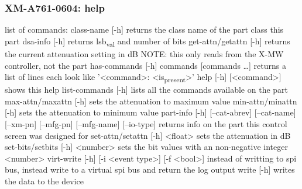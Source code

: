 \documentclass[11pt]{article}
\begin{document}
\subsubsection{XM-A761-0604: help}
\label{sec:orga833b20}
list of commands:
  class-name [-h]
    returns the class name of the part class this part
  dsa-info [-h]
    returns lsb\textsubscript{val} and number of bits
  get-attn/getattn [-h]
    returns the current attenuation setting in dB
    NOTE: this only reads from the X-MW controller, not the part
  has-commands [-h] commands [commands \ldots{}]
    returns a list of lines each look like '<command>: <is\textsubscript{present}>'
  help [-h] [<command>]
    shows this help
  list-commands [-h]
    lists all the commands available on the part
  max-attn/maxattn [-h]
    sets the attenuation to maximum value
  min-attn/minattn [-h]
    sets the attenuation to minimum value
  part-info  [-h] [--cat-abrev] [--cat-name] [--xm-pn] [--mfg-pn] [--mfg-name]
          [--io-type]
    returns info on the part this control screen was designed for
  set-attn/setattn [-h] <float>
    sets the attenuation in dB
  set-bits/setbits [-h] <number>
    sets the bit values with an non-negative integer <number>
  virt-write [-h] [-i <event type>] [-f <bool>]
    instead of writting to spi bus, instead write to a virtual spi bus
    and return the log output
  write [-h]
    writes the data to the device
\end{document}
